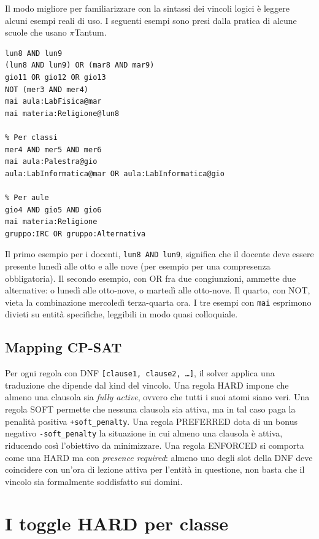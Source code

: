 Il modo migliore per familiarizzare con la sintassi dei
vincoli logici \`e leggere alcuni esempi reali di uso. I
seguenti esempi sono presi dalla pratica di alcune scuole
che usano $\pi$Tantum.

\begin{lstlisting}[basicstyle=\ttfamily\small]
% Per docenti
lun8 AND lun9
(lun8 AND lun9) OR (mar8 AND mar9)
gio11 OR gio12 OR gio13
NOT (mer3 AND mer4)
mai aula:LabFisica@mar
mai materia:Religione@lun8

% Per classi
mer4 AND mer5 AND mer6
mai aula:Palestra@gio
aula:LabInformatica@mar OR aula:LabInformatica@gio

% Per aule
gio4 AND gio5 AND gio6
mai materia:Religione
gruppo:IRC OR gruppo:Alternativa
\end{lstlisting}

Il primo esempio per i docenti, \texttt{lun8 AND lun9},
significa che il docente deve essere presente luned\`i alle
otto e alle nove (per esempio per una compresenza
obbligatoria). Il secondo esempio, con OR fra due
congiunzioni, ammette due alternative: o luned\`i alle
otto-nove, o marted\`i alle otto-nove. Il quarto, con NOT,
vieta la combinazione mercoled\`i terza-quarta ora. I tre
esempi con \texttt{mai} esprimono divieti su entit\`a
specifiche, leggibili in modo quasi colloquiale.

\subsection{Mapping CP-SAT}

Per ogni regola con DNF \texttt{[clause1, clause2, \ldots]},
il solver applica una traduzione che dipende dal kind del
vincolo. Una regola HARD impone che almeno una clausola sia
\emph{fully active}, ovvero che tutti i suoi atomi siano
veri. Una regola SOFT permette che nessuna clausola sia
attiva, ma in tal caso paga la penalit\`a positiva
\texttt{+soft\_penalty}. Una regola PREFERRED dota di un
bonus negativo \texttt{-soft\_penalty} la situazione in cui
almeno una clausola \`e attiva, riducendo cos\`i
l'obiettivo da minimizzare. Una regola ENFORCED si comporta
come una HARD ma con \emph{presence required}: almeno uno
degli slot della DNF deve coincidere con un'ora di lezione
attiva per l'entit\`a in questione, non basta che il vincolo
sia formalmente soddisfatto sui domini.

\section{I toggle HARD per classe}

